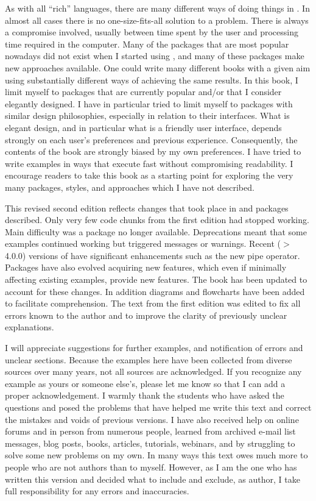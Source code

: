 As with all ``rich'' languages, there are many different ways of doing things in \Rlang. In almost all cases there is no one-size-fits-all solution to a problem. There is always a compromise involved, usually between time spent by the user and processing time required in the computer. Many of the packages that are most popular nowadays did not exist when I started using \Rlang, and many of these packages make new approaches available. One could write many different \Rlang books with a given aim using substantially different ways of achieving the same results. In this book, I limit myself to packages that are currently popular and/or that I consider elegantly designed. I have in particular tried to limit myself to packages with similar design philosophies, especially in relation to their interfaces. What is elegant design, and in particular what is a friendly user interface, depends strongly on each user's preferences and previous experience. Consequently, the contents of the book are strongly biased by my own preferences. I have tried to write examples in ways that execute fast without compromising readability. I encourage readers to take this book as a starting point for exploring the very many packages, styles, and approaches which I have not described.

This revised second edition reflects changes that took place in \Rlang and packages described. Only very few code chunks from the first edition had stopped working. Main difficulty was a package no longer available. Deprecations meant that some examples continued working but triggered messages or warnings. Recent ($>$ 4.0.0) versions of \Rlang have significant enhancements such as the new pipe operator. Packages have also evolved acquiring new features, which even if minimally affecting existing examples, provide new features. The book has been updated to account for these changes. In addition diagrams and flowcharts have been added to facilitate comprehension. The text from the first edition was edited to fix all errors known to the author and to improve the clarity of previously unclear explanations.

I will appreciate suggestions for further examples, and notification of errors and unclear sections. Because the examples here have been collected from diverse sources over many years, not all sources are acknowledged. If you recognize any example as yours or someone else's, please let me know so that I can add a proper acknowledgement. I warmly thank the students who have asked the questions and posed the problems that have helped me write this text and correct the mistakes and voids of previous versions. I have also received help on online forums and in person from numerous people, learned from archived e-mail list messages, blog posts, books, articles, tutorials, webinars, and by struggling to solve some new problems on my own. In many ways this text owes much more to people who are not authors than to myself. However, as I am the one who has written this version and decided what to include and exclude, as author, I take full responsibility for any errors and inaccuracies.

